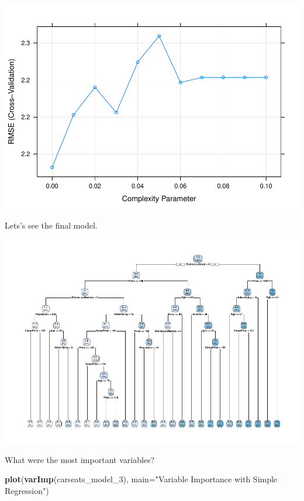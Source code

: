 \documentclass[
]{book}
\newenvironment{Shaded}{\begin{snugshade}}{\end{snugshade}}
\newcommand{\DataTypeTok}[1]{\textcolor[rgb]{0.13,0.29,0.53}{#1}}
\newcommand{\DecValTok}[1]{\textcolor[rgb]{0.00,0.00,0.81}{#1}}
\newcommand{\KeywordTok}[1]{\textcolor[rgb]{0.13,0.29,0.53}{\textbf{#1}}}
\newcommand{\NormalTok}[1]{#1}
\newcommand{\OperatorTok}[1]{\textcolor[rgb]{0.81,0.36,0.00}{\textbf{#1}}}
\newcommand{\StringTok}[1]{\textcolor[rgb]{0.31,0.60,0.02}{#1}}
\begin{document}
\includegraphics{data-sci_files/figure-latex/unnamed-chunk-108-1.pdf}

Lets's see the final model.

\begin{Shaded}
\end{Shaded}

\includegraphics{data-sci_files/figure-latex/unnamed-chunk-109-1.pdf}

What were the most important variables?

\begin{Shaded}
\begin{Highlighting}[]
\KeywordTok{plot}\NormalTok{(}\KeywordTok{varImp}\NormalTok{(carseats_model_}\DecValTok{3}\NormalTok{), }\DataTypeTok{main=}\StringTok{"Variable Importance with Simple Regression"}\NormalTok{)}
\end{Highlighting}
\end{Shaded}
\end{document}
